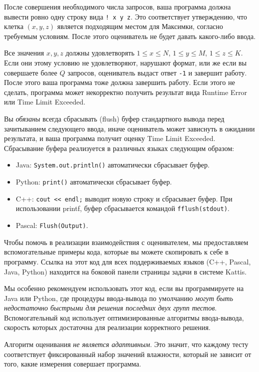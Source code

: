 После совершения необходимого числа запросов, ваша программа должна вывести ровно одну строку вида \texttt{!\ x y z}.
Это соответствует утверждению, что клетка $(x, y, z)$ является подходящим местом для Максимки, согласно требуемым условиям. После этого оцениватель не будет давать какого-либо ввода.

Все значения $x, y, z$ должны удовлетворять $1 \le x \le N$, $1 \le y \le M$, $1 \le z \le K$.
Если они этому условию не удовлетворяют, нарушают формат, или же если вы совершаете более $Q$ запросов, оцениватель выдаст ответ \texttt{-1} и завершит работу.
После этого ваша программа тоже должна завершить работу. Если этого не сделать, программа может некорректно получить результат вида Runtime Error или Time Limit Exceeded.

Вы \emph{обязаны} всегда сбрасывать (flush) буфер стандартного вывода перед зачитыванием следующего ввода, иначе оцениватель может зависнуть в ожидании результата, и ваша программа получит оценку Time Limit Exceeded. Сбрасывание буфера реализуется в различных языках следующим образом:
\begin{itemize}
  \item Java: \texttt{System.out.println()} автоматически сбрасывает буфер.
  \item Python: \texttt{print()} автоматически сбрасывает буфер.
  \item C++: \verb#cout << endl;# выводит новую строку и сбрасывает буфер. При использовании printf, буфер сбрасывается командой \texttt{fflush(stdout)}.
  \item Pascal: \texttt{Flush(Output)}.
\end{itemize}

Чтобы помочь в реализации взаимодействия с оценивателем, мы предоставляем вспомогательные примеры кода, которые вы можете скопировать к себе в программу.
Ссылка на этот код для всех поддерживаемых языков (C++, Pascal, Java, Python) находится на боковой панели страницы задачи в системе Kattis.

Мы особенно рекомендуем использовать этот код, если вы программируете на Java или Python, где процедуры ввода-вывода по умолчанию \emph{могут быть недостаточно быстрыми для решения последних двух групп тестов}.
Вспомогательный код использует оптимизированные алгоритмы ввода-вывода, скорость которых достаточна для реализации корректного решения.

Алгоритм оценивания \emph{не является адаптивным}. Это значит, что каждому тесту соответствует фиксированный набор значений влажности, который не зависит от того, какие измерения совершает программа.

